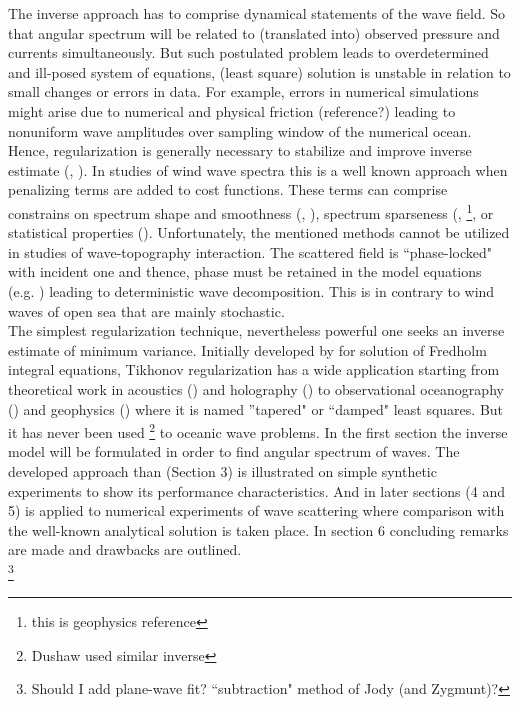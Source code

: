 The inverse approach has to comprise dynamical statements of the wave field. So that angular spectrum will be related to (translated into) observed pressure and currents simultaneously. But such postulated problem leads to overdetermined and ill-posed system of equations, (least square) solution is unstable in relation to small changes or errors in data. For example, errors in numerical simulations might arise due to numerical and physical friction (reference?) leading to nonuniform wave amplitudes over sampling window of the numerical ocean. Hence, regularization is generally necessary to stabilize and improve inverse estimate (\cite{munk2009ocean}, \cite{snieder1999inverse}). In studies of wind wave spectra this is a well known approach when penalizing terms are added to cost functions. These terms can comprise constrains on spectrum shape and smoothness (\cite{long1979variational}, \cite{herbers1990estimation}), spectrum sparseness (\cite{hashimoto1989directional}, \cite{sacchi1996estimation}\footnote{this is geophysics reference}, or statistical properties (\cite{benoit1997analysing}). Unfortunately, the mentioned methods cannot be utilized in studies of wave-topography interaction. The scattered field is ``phase-locked" with incident one and thence, phase must be retained in the model equations (e.g. \cite{thomson2005reflection}) leading to deterministic wave decomposition. This is in contrary to wind waves of open sea that are mainly stochastic.\\

The simplest regularization technique, nevertheless powerful one seeks an inverse estimate of minimum variance. Initially developed by \cite{tikhonov2013numerical} for solution of Fredholm integral equations, Tikhonov regularization has a wide application starting from theoretical work in acoustics (\cite{colton1996simple}) and holography (\cite{williams2001regularization}) to observational oceanography (\cite{munk2009ocean}) and geophysics (\cite{snieder1999inverse}) where it is named ''tapered" or ``damped" least squares. But it has never been used \footnote{Dushaw used similar inverse} to oceanic wave problems. In the first section the inverse model will be formulated in order to find angular spectrum of waves. The developed approach than (Section 3) is illustrated on simple synthetic experiments to show its performance characteristics. And in later sections (4 and 5) is applied to numerical experiments of wave scattering where comparison with the well-known analytical solution is taken place. In section 6 concluding remarks are made and drawbacks are outlined.\\
\footnote{Should I add plane-wave fit? ``subtraction" method of Jody (and Zygmunt)?}
~\\

